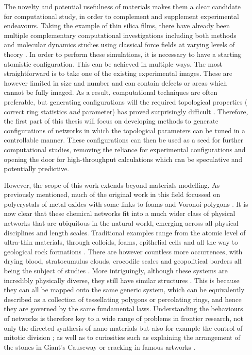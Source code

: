 The novelty and potential usefulness of \td{} materials makes them a  clear candidate for computational study, in order to complement and supplement experimental endeavours. 
Taking the example of thin silica films, there have already been multiple complementary computational investigations including both \abinitio{} methods and molecular dynamics studies using classical force fields at varying levels of theory \cite{Bjorkman2013,Malashevich2016,Wilson2013,Wilson2018,Zhang2018a,Bamer2019,Roy2019,Richter2019}.
In order to perform these simulations, it is necessary to have a starting atomistic configuration.
This can be achieved in multiple ways. 
The most straightforward is to take one of the existing experimental images. 
These are however limited in size and number and can contain defects or areas which cannot be fully imaged.
As a result, computational techniques are often preferable, but generating configurations will the required topological properties (\ie{} correct ring statistics \textit{and} \aw{} parameter) has proved surprisingly difficult \cite{Roy2018,Kumar2014}.
Therefore, the first part of this thesis will focus on developing methods to generate configurations of \td{} networks in which the topological parameters can be tuned in a controllable manner.
These configurations can then be used as a seed for further computational studies, removing the reliance for experimental configurations and opening the door for high\--throughput calculations which can be speculative and potentially predictive.

However, the scope of this work extends beyond materials modelling.
As previously mentioned, much of the original work in this field focussed on polycrystals of metal oxides with some links to foams and Voronoi polygons \cite{Aboav1980,Boots1984}.
It is now clear that these chemical networks fit into a much wider class of \td{} physical networks that are ubiquitous in the natural world, emerging across all physical disciplines and length scales.
Traditional examples range from the atomic level of ultra\--thin materials, through colloids, foams, epithelial cells and all the way to geological rock formations \cite{Earnshaw1994,Allain1995,Durand2011,Tong2017,Goehring2014}.
There are however countless more occurrences, with drying blood, stratocumulus clouds, crocodile scales and geopolitical borders all being the subject of studies \cite{Brutin2011,Glassmeier2017,Milinkovitch2019,LeCaer1993}.
More intriguingly, although these systems are incredibly physically diverse, they still have similar structures \cite{Schliecker1999}. 
This is because they can all be mapped onto the same generic system, which can be equivalently described as a collection of tessellating polygons or percolating rings, and hence they are governed by the same fundamental laws. 
Understanding the behaviours of \td{} networks is therefore key to a wide range of problems in frontier research, not only the directed synthesis of nano\--materials but also for example the control of mitotic division \cite{Gibson2011,Ladan2019}; as well as to curiosities such as explaining the arrangement of the stones in Giant's Causeway or cracking in famous artworks \cite{Weaire1984,Flores2017}.

